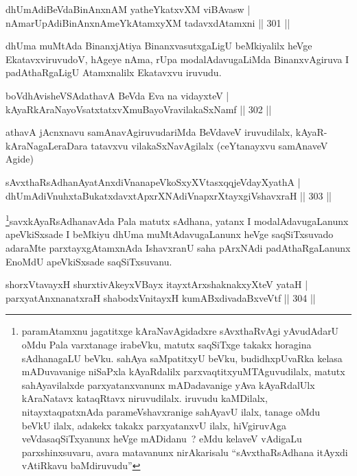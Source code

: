 \begin{shl}
dhUmAdiBeVdaBinAnxnAM yatheYkatxvXM viBAvasw |
nAmarUpAdiBinAnxnAmeYkAtamxyXM tadavxdAtamxni \hfill || 301 ||
\end{shl}

\begin{artha}
dhUma muMtAda BinanxjAtiya BinanxvasutxgaLigU beMkiyalilx heVge EkatavxviruvudoV, hAgeye nAma, rUpa modalAdavugaLiMda BinanxvAgiruva I padAthaRgaLigU Atamxnalilx Ekatavxvu iruvudu.
\end{artha}


	\begin{shl}
boVdhAvisheVSAdathavA BeVda Eva na vidayxteV |
kAyaRkAraNayoVsatxtatxvXmuBayoVravilakaSxNamf \hfill || 302 ||
\end{shl}

\begin{artha}
athavA jAcnxnavu samAnavAgiruvudariMda BeVdaveV iruvudilalx, kAyaR-kAraNagaLeraDara tatavxvu vilakaSxNavAgilalx (ceYtanayxvu samAnaveV Agide)
\end{artha}

\begin{shl}
sAvxthaRsAdhanAyatAnxdiVnanapeVkoSxyXVtasxqqjeVdayXyathA |
dhUmAdiVnuhxtaBukatxdavxtApxrXNAdiVnapxrXtayxgiVshavxraH \hfill || 303 ||
\end{shl}

\begin{artha}
\footnote[1]{paramAtamxnu jagatitxge kAraNavAgidadxre sAvxthaRvAgi yAvudAdarU oMdu Pala varxtanage irabeVku, matutx saqSiTxge takakx horagina sAdhanagaLU beVku. sahAya saMpatitxyU beVku, budidhxpUvaRka kelasa mADuvavanige niSaPxla kAyaRdalilx parxvaqtitxyuMTAguvudilalx, matutx sahAyavilalxde parxyatanxvanunx mADadavanige yAva kAyaRdalUlx kAraNatavx kataqRtavx niruvudilalx. iruvudu kaMDilalx, nitayxtaqpatxnAda parameVshavxranige sahAyavU ilalx, tanage oMdu beVkU ilalx, adakekx takakx parxyatanxvU ilalx, hiVgiruvAga veVdasaqSiTxyanunx heVge mADidanu~? eMdu kelaveV vAdigaLu parxshinxsuvaru, avara matavanunx nirAkarisalu ``sAvxthaRsAdhana itAyxdi vAtiRkavu baMdiruvudu''}savxkAyaRsAdhanavAda Pala matutx sAdhana, yatanx I modalAdavugaLanunx apeVkiSxsade I beMkiyu dhUma muMtAdavugaLanunx heVge saqSiTxsuvado adaraMte parxtayxgAtamxnAda IshavxranU saha pArxNAdi padAthaRgaLanunx EnoMdU apeVkiSxsade saqSiTxsuvanu.
\end{artha}

\begin{shl}
shorxVtavayxH shurxtivAkeyxVBayx itayxtArx\s \s shaknakxyXteV yataH |
parxyatAnxnanatxraH shabodxV\s nitayxH kumABxdivadaBxveVtf \hfill || 304 ||
\end{shl}


